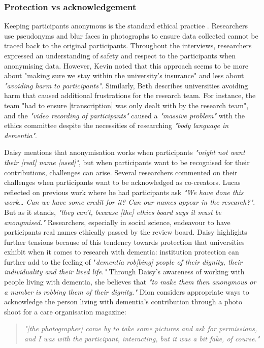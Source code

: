 \subsubsection{Protection vs acknowledgement}
\label{Ethics:ThemeOnePartThree}

Keeping participants anonymous is the standard ethical practice \citep{novak_anonymity_2014}. Researchers use pseudonyms and blur faces in photographs to ensure data collected cannot be traced back to the original participants. Throughout the interviews, researchers expressed an understanding of safety and respect to the participants when anonymising data. However, Kevin noted that this approach seems to be more about "making sure we stay within the university's insurance" and less about \textit{"avoiding harm to participants"}. Similarly, Beth describes universities avoiding harm that caused additional frustrations for the research team. For instance, the team "had to ensure [transcription] was only dealt with by the research team", and the \textit{"video recording of participants"} caused a \textit{"massive problem"} with the ethics committee despite the necessities of researching \textit{"body language in dementia"}. 

Daisy mentions that anonymisation works when participants \textit{"might not want their [real] name [used]"}, but when participants want to be recognised for their contributions, challenges can arise. Several researchers commented on their challenges when participants want to be acknowledged as co-creators. Lucas reflected on previous work where he had participants ask \textit{"We have done this work… Can we have some credit for it? Can our names appear in the research?"}. But as it stands, \textit{"they can't, because [the] ethics board says it must be anonymised."} Researchers, especially in social science, endeavour to have participants real names ethically passed by the review board. Daisy highlights further tensions because of this tendency towards protection that universities exhibit when it comes to research with dementia: institution protection can further add to the feeling of "\textit{dementia rob[bing] people of their dignity, their individuality and their lived life."} Through Daisy's awareness of working with people living with dementia, she believes that \textit{"to make them then anonymous or a number is robbing them of their dignity."} Dion considers appropriate ways to acknowledge the person living with dementia's contribution through a photo shoot for a care organisation magazine: 
\begin{quote}
\textit{"[the photographer] came by to take some pictures and ask for permissions, and I was with the participant, interacting, but it was a bit fake, of course." 
}
\end{quote}

